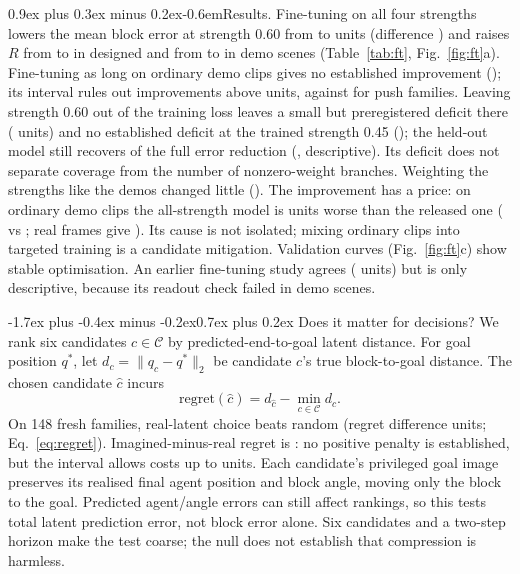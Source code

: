 \documentclass[10pt,twocolumn,a4paper]{article}
\makeatletter
\newcommand{\R}{\ensuremath{R}}
\renewcommand\section{\@startsection{section}{1}{\z@}%
  {-1.7ex plus -0.4ex minus -0.2ex}{0.7ex plus 0.2ex}%
  {\normalfont\large\bfseries\color{accent}}}
\renewcommand\paragraph{\@startsection{paragraph}{4}{\z@}%
  {0.9ex plus 0.3ex minus 0.2ex}{-0.6em}{\normalfont\normalsize\bfseries}}
\makeatother
\begin{document}
\paragraph{Results.} Fine-tuning on all four strengths lowers the mean block error at
strength 0.60 from \tdMeanFrozen{} to \tdMeanBalanced{} units (difference
\tdFrozenMinusBal) and raises \R{} from \tdRatioChallengeFrozen{} to \tdRatioChallengeBalanced{} in designed and
from \tdRatioArchiveFrozen{} to \tdRatioArchiveBalanced{} in demo scenes
(Table~\ref{tab:ft}, Fig.~\ref{fig:ft}a). Fine-tuning as long on ordinary demo clips gives
no established improvement (\tdFrozenMinusArchOnly); its interval rules out improvements above
\tdArchOnlyBound{} units, against \tdFrozenMinusBalPt{} for push families. Leaving
strength 0.60 out of the training loss leaves a small but preregistered deficit there
(\tdOmitMinusBal{} units) and no established deficit at the trained strength 0.45
(\tdOmitMinusBalInSupport); the held-out model still recovers \tdTransferPercent{} of the
full error reduction (\tdTransfer, descriptive). Its deficit does not separate coverage
from the number of nonzero-weight branches. Weighting
the strengths like the demos changed little (\tdMeanArchWeighted). The improvement has a
price: on ordinary demo clips the all-strength model is \tdOrdBalMinusFrozen{} units worse
than the released one (\tdOrdMeanBalanced{} vs \tdOrdMeanFrozen; real frames give
\tdOrdMeanReal). Its cause is not isolated; mixing ordinary clips into targeted training
is a candidate mitigation. Validation curves (Fig.~\ref{fig:ft}c) show stable optimisation. An
earlier fine-tuning study agrees (\trainBalMinusFrozen{} units) but is only descriptive,
because its readout check failed in demo scenes.

\section{Does it matter for decisions?}
We rank six candidates $c\in\mathcal C$ by predicted-end-to-goal latent distance.
For goal position $q^*$, let $d_c=\lVert q_c-q^*\rVert_2$ be candidate $c$'s true
block-to-goal distance. The chosen candidate $\hat c$ incurs
\begin{equation}\label{eq:regret}
\mathrm{regret}(\hat c)=d_{\hat c}-\min_{c\in\mathcal C}d_c.
\end{equation}
On 148 fresh families, real-latent choice beats random (regret difference
\planRealMinusRandom{} units; Eq.~\ref{eq:regret}). Imagined-minus-real regret is
\planJepaMinusReal: no positive penalty is established, but the interval allows costs
up to \planBound{} units. Each candidate's privileged goal image preserves its realised final
agent position and block angle, moving only the block to the goal. Predicted agent/angle
errors can still affect rankings, so this tests total latent prediction error, not block
error alone. Six candidates and a two-step horizon make the test coarse; the null does
not establish that compression is harmless.
\end{document}
